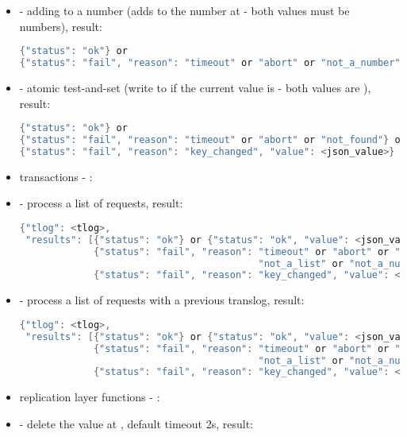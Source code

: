 \begin{itemize}
\begin{lstlisting}[language=java]
\end{lstlisting}
  \item {} - adding to a number
  (adds  to the number at  - both values must be numbers), result:
\begin{lstlisting}[language=java]
{"status": "ok"} or
{"status": "fail", "reason": "timeout" or "abort" or "not_a_number"}
\end{lstlisting}
  \item {} - atomic test-and-set
  (write  to  if the current value is 
   - both values are ), result:
\begin{lstlisting}[language=java]
{"status": "ok"} or
{"status": "fail", "reason": "timeout" or "abort" or "not_found"} or
{"status": "fail", "reason": "key_changed", "value": <json_value>}
\end{lstlisting}
  \item[] \hspace{-1.7em}transactions - :
  \item {} - process a list of requests, result:
\begin{lstlisting}[language=java]
{"tlog": <tlog>,
 "results": [{"status": "ok"} or {"status": "ok", "value": <json_value>} or
             {"status": "fail", "reason": "timeout" or "abort" or "not_found" or
                                          "not_a_list" or "not_a_number"} or
             {"status": "fail", "reason": "key_changed", "value": <json_value>}]}
\end{lstlisting}
  \item {} - process a list of requests with a previous translog, result:
\begin{lstlisting}[language=java]
{"tlog": <tlog>,
 "results": [{"status": "ok"} or {"status": "ok", "value": <json_value>} or
             {"status": "fail", "reason": "timeout" or "abort" or "not_found" or
                                          "not_a_list" or "not_a_number"} or
             {"status": "fail", "reason": "key_changed", "value": <json_value>}]}
\end{lstlisting}
  \item[] \hspace{-1.7em}replication layer functions - :
  \item {} - delete the value at , default timeout 2s, result:

\end{itemize}
